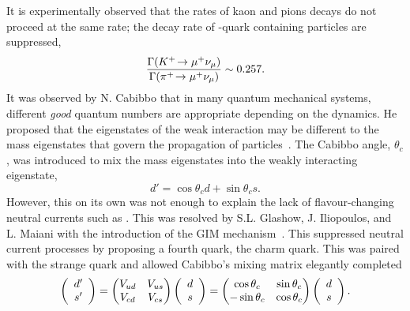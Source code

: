 It is experimentally observed that the rates of kaon and pions decays do not proceed at the same rate; the decay rate of \squark-quark containing particles are suppressed,
\begin{equation}
\frac{\Gamma({{K}^+}\!\rightarrow {\ensuremath{\mu^+}}{\ensuremath{{\nu}_\mu}})}{\Gamma({{\pi}^+}\!\rightarrow {\ensuremath{\mu^+}}{\ensuremath{{\nu}_\mu}})}\sim 0.257.
\end{equation}
It was observed by N. Cabibbo that in many quantum mechanical systems, different \emph{good} quantum numbers are appropriate depending on the dynamics. He proposed that the eigenstates of the weak interaction may be different to the mass eigenstates that govern the propagation of particles~\cite{PhysRevLett.10.531}.
The Cabibbo angle, $\theta_{c}$, was introduced to mix the mass eigenstates into the weakly interacting eigenstate,
\begin{equation}
d' = \cos{\theta_{c}}d + \sin{\theta_{c}}s.
\end{equation}
However, this on its own was not enough to explain the lack of flavour-changing neutral currents such as \decay{\Kz}{\mup\mun}. This was resolved by S.L. Glashow, J. Iliopoulos, and L. Maiani with the introduction of the GIM mechanism~\cite{PhysRevD.2.1285}. This suppressed neutral current processes by proposing a fourth quark, the charm quark. This was paired with the strange quark and allowed  Cabibbo's mixing matrix elegantly completed
\begin{equation}
\left( \begin{array}{c} d' \\ s'  \end{array} \right) = \begin{pmatrix} {\ensuremath{V_{{u}{d}}}} & {V_{{u}{s}}} \\ {V_{{c}{d}}} & {V_{{c}{s}}} \end{pmatrix} \left( \begin{array}{c} d \\ s \end{array} \right)= \begin{pmatrix} \cos{\theta_{c}} & \sin{\theta_{c}} \\ -\sin{\theta_{c}} & \cos{\theta_{c}} \end{pmatrix} \left( \begin{array}{c} d \\ s \end{array} \right).
\end{equation}

